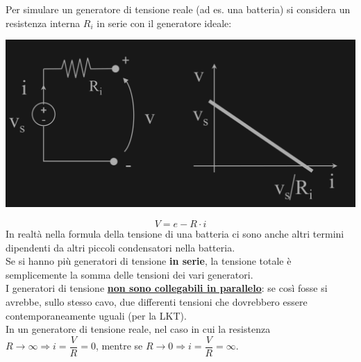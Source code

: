 \documentclass{article}
\begin{document}
Per simulare un generatore
di tensione reale (ad es. una batteria) si
considera un resistenza
interna $R_i$ in serie con il
generatore ideale:
\begin{center}
    \includegraphics[scale=0.2]{Image/Gen tensione reale.png}
\end{center}
\[
    V = e - R \cdot i
\]
In realtà nella formula della tensione di una batteria ci sono anche altri termini dipendenti da altri piccoli condensatori nella batteria.
\vspace*{0.2cm}\\
Se si hanno più generatori di tensione \textbf{in serie}, la tensione totale è semplicemente la somma delle tensioni dei vari generatori.\\
I generatori di tensione \textbf{\underline{non sono collegabili in parallelo}}: se così fosse si avrebbe, sullo stesso cavo, due differenti tensioni che dovrebbero essere contemporaneamente uguali (per la LKT).
\vspace*{0.2cm}\\
In un generatore di tensione reale, nel caso in cui la resistenza $R \rightarrow \infty \Longrightarrow i = \dfrac{V}{R} = 0$, mentre se $R \rightarrow 0 \Longrightarrow i=\dfrac{V}{R}= \infty$.
\end{document}
